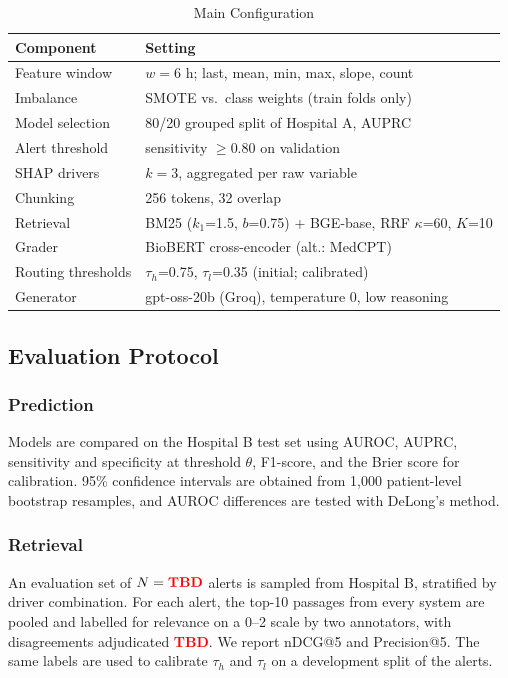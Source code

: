 \documentclass[conference]{IEEEtran}
\newcommand{\tbd}{\textcolor{red}{\textbf{TBD}}}
\begin{document}
\begin{table}[!t]
\caption{Main Configuration}
\label{tab:config}
\centering
\footnotesize
\begin{tabular}{@{}ll@{}}
\toprule
Component & Setting \\
\midrule
Feature window & $w=6$ h; last, mean, min, max, slope, count \\
Imbalance & SMOTE vs.\ class weights (train folds only) \\
Model selection & 80/20 grouped split of Hospital A, AUPRC \\
Alert threshold & sensitivity $\ge 0.80$ on validation \\
SHAP drivers & $k=3$, aggregated per raw variable \\
Chunking & 256 tokens, 32 overlap \\
Retrieval & BM25 ($k_1$=1.5, $b$=0.75) + BGE-base, RRF $\kappa$=60, $K$=10 \\
Grader & BioBERT cross-encoder (alt.: MedCPT) \\
Routing thresholds & $\tau_h$=0.75, $\tau_l$=0.35 (initial; calibrated) \\
Generator & gpt-oss-20b (Groq), temperature 0, low reasoning \\
\bottomrule
\end{tabular}
\end{table}

\subsection{Evaluation Protocol}
\subsubsection{Prediction}
Models are compared on the Hospital B test set using AUROC, AUPRC,
sensitivity and specificity at threshold $\theta$, F1-score, and the Brier
score for calibration. 95\% confidence intervals are obtained from 1{,}000
patient-level bootstrap resamples, and AUROC differences are tested with
DeLong's method.

\subsubsection{Retrieval}
An evaluation set of $N=\tbd$ alerts is sampled from Hospital B, stratified
by driver combination. For each alert, the top-10 passages from every
system are pooled and labelled for relevance on a 0--2 scale by two
annotators, with disagreements adjudicated \tbd. We report nDCG@5 and
Precision@5. The same labels are used to calibrate $\tau_h$ and $\tau_l$ on
a development split of the alerts.
\end{document}
